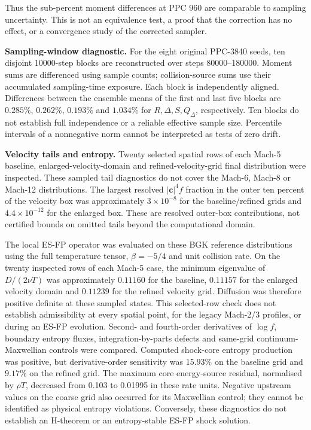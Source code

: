 \documentclass[lineno,paper]{JFM-FLM_Au}
\newenvironment{revision}{\begingroup\colorlet{shadecolor}{revisionyellow}\begin{shaded}}{\end{shaded}\endgroup}
\newenvironment{revision}{}{}
\begin{document}
\begin{revision}
Thus the sub-percent moment differences at PPC 960 are comparable to sampling uncertainty. This is not an equivalence test, a proof that the correction has no effect, or a convergence study of the corrected sampler.

\textbf{Sampling-window diagnostic.} For the eight original PPC-3840 seeds, ten disjoint 10000-step blocks are reconstructed over steps 80000--180000. Moment sums are differenced using sample counts; collision-source sums use their accumulated sampling-time exposure. Each block is independently aligned. Differences between the ensemble means of the first and last five blocks are $0.285\%$, $0.262\%$, $0.193\%$ and $1.034\%$ for $R,\Delta,S,Q_\Delta$, respectively. Ten blocks do not establish full independence or a reliable effective sample size. Percentile intervals of a nonnegative norm cannot be interpreted as tests of zero drift.

\textbf{Velocity tails and entropy.} Twenty selected spatial rows of each Mach-5 baseline, enlarged-velocity-domain and refined-velocity-grid final distribution were inspected. These sampled tail diagnostics do not cover the Mach-6, Mach-8 or Mach-12 distributions. The largest resolved $|\boldsymbol c|^4 f$ fraction in the outer ten percent of the velocity box was approximately $3\times10^{-8}$ for the baseline/refined grids and $4.4\times10^{-12}$ for the enlarged box. These are resolved outer-box contributions, not certified bounds on omitted tails beyond the computational domain.

The local ES-FP operator was evaluated on these BGK reference distributions using the full temperature tensor, $\beta=-5/4$ and unit collision rate. On the twenty inspected rows of each Mach-5 case, the minimum eigenvalue of $D/(2\nu T)$ was approximately $0.11160$ for the baseline, $0.11157$ for the enlarged velocity domain and $0.11239$ for the refined velocity grid. Diffusion was therefore positive definite at these sampled states. This selected-row check does not establish admissibility at every spatial point, for the legacy Mach-2/3 profiles, or during an ES-FP evolution. Second- and fourth-order derivatives of $\log f$, boundary entropy fluxes, integration-by-parts defects and same-grid continuum-Maxwellian controls were compared. Computed shock-core entropy production was positive, but derivative-order sensitivity was $15.93\%$ on the baseline grid and $9.17\%$ on the refined grid. The maximum core energy-source residual, normalised by $\rho T$, decreased from 0.103 to 0.01995 in these rate units. Negative upstream values on the coarse grid also occurred for its Maxwellian control; they cannot be identified as physical entropy violations. Conversely, these diagnostics do not establish an H-theorem or an entropy-stable ES-FP shock solution.


\end{revision}
\end{document}
